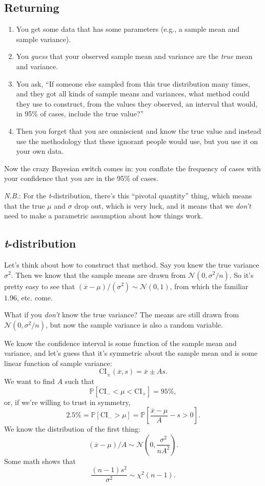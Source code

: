 \documentclass{book}
\providecommand{\tightlist}{%
  \setlength{\itemsep}{0pt}\setlength{\parskip}{0pt}}
\begin{document}
\subsection{Returning}\label{returning}

\begin{enumerate}
\def\labelenumi{\arabic{enumi}.}
\tightlist
\item
  You get some data that has some parameters (e.g., a sample mean and
  sample variance).
\item
  You \emph{guess} that your observed sample mean and variance are the
  \emph{true} mean and variance.
\item
  You ask, ``If someone else sampled from this true distribution many
  times, and they got all kinds of sample means and variances, what
  method could they use to construct, from the values they observed, an
  interval that would, in 95\% of cases, include the true value?''
\item
  Then you forget that you are omniscient and know the true value and
  instead use the methodology that these ignorant people would use, but
  you use it on your own data.
\end{enumerate}

Now the crazy Bayesian switch comes in: you conflate the frequency of
cases with your confidence that you are in the 95\% of cases.

\emph{N.B.}: For the \emph{t}-distribution, there's this ``pivotal
quantity'' thing, which means that the true \(\mu\) and \(\sigma\) drop
out, which is very luck, and it means that we \emph{don't} need to make
a parametric assumption about how things work.

\subsection{\texorpdfstring{\emph{t}-distribution}{t-distribution}}\label{t-distribution}

Let's think about how to construct that method. Say you knew the true
variance \(\sigma^2\). Then we know that the sample means are drawn from
\(\mathcal{N}(0, \sigma^2/n)\). So it's pretty easy to see that
\((\overline{x} - \mu) / (\sigma^2) \sim \mathcal{N}(0, 1)\), from which
the familiar \(1.96\), etc. come.

What if you \emph{don't} know the true variance? The means are still
drawn from \(\mathcal{N}(0, \sigma^2/n)\), but now the sample variance
is also a random variable.

We know the confidence interval is some function of the sample mean and
variance, and let's guess that it's symmetric about the sample mean and
is some linear function of sample variance: \[
\mathrm{CI}_\pm(\overline{x}, s) = \overline{x} \pm A s.
\] We want to find \(A\) such that \[
\mathbb{P}\left[ \mathrm{CI}_- < \mu < \mathrm{CI}_+ \right] = 95\%,
\] or, if we're willing to trust in symmetry, \[
2.5\% = \mathbb{P}\left[ \mathrm{CI}_- > \mu \right] = \mathbb{P}\left[ \frac{\overline{x} - \mu}{A} - s > 0 \right].
\] We know the distribution of the first thing: \[
(\overline{x}-\mu)/A \sim \mathcal{N}\left(0, \frac{\sigma^2}{n A^2}\right).
\] Some math shows that \[
\frac{(n-1) s^2}{\sigma^2} \sim \chi^2(n-1).
\]
\end{document}
